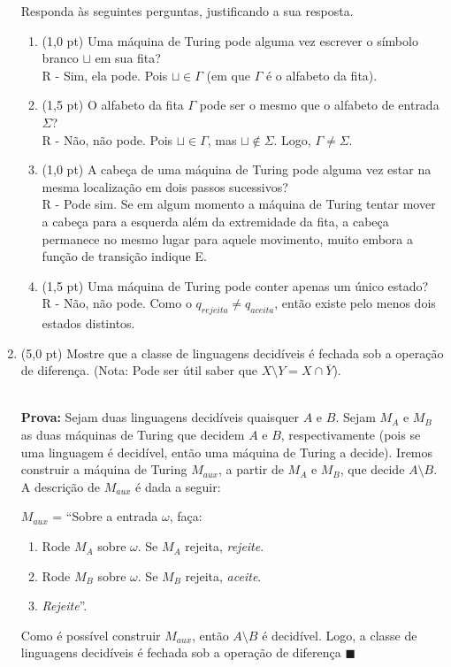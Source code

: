 \documentclass[12pt,a4paper,oneside]{article}
\begin{document}
\begin{enumerate}
	 Responda às seguintes perguntas, justificando a sua resposta.
	\begin{enumerate}
		\item (1,0 pt) Uma máquina de Turing pode alguma vez escrever o símbolo branco $\sqcup$ em sua fita? \\
		{\color{blue}
			R - Sim, ela pode. Pois $\sqcup \in \Gamma$ (em que $\Gamma$ é o alfabeto da fita).
		}
		\item (1,5 pt) O alfabeto da fita $\Gamma$ pode ser o mesmo que o alfabeto de entrada $\Sigma$? \\
		{\color{blue}
			R - Não, não pode. Pois $\sqcup \in \Gamma$, mas $\sqcup \not\in \Sigma$. Logo, $\Gamma \not= \Sigma$.
		}
		\item (1,0 pt) A cabeça de uma máquina de Turing pode alguma vez estar na mesma localização em dois passos sucessivos?\\
		{\color{blue}
			R - Pode sim. Se em algum momento a máquina de Turing tentar mover a cabeça para a esquerda além da extremidade da fita, a cabeça permanece no mesmo lugar para aquele movimento, muito embora a função de transição indique E. 
		}
		\item (1,5 pt) Uma máquina de Turing pode conter apenas um único estado?\\
		{\color{blue}
			R - Não, não pode. Como o $q_{rejeita} \not= q_{aceita}$, então existe pelo menos dois estados distintos.
		}
	\end{enumerate}

\newpage
	
	\item (5,0 pt) Mostre que a classe de linguagens decidíveis é fechada sob a operação de diferença. (Nota: Pode ser útil saber que $X \setminus Y = X \cap \overline{Y}$).\\
	\\{\color{blue}	
		{\bf Prova:} Sejam duas linguagens decidíveis quaisquer $A$ e $B$. Sejam $M_A$ e $M_B$ as duas máquinas de Turing que decidem $A$ e $B$, respectivamente (pois se uma linguagem é decidível, então uma máquina de Turing a decide). Iremos construir a máquina de Turing $M_{aux}$, a partir de $M_A$ e $M_B$, que decide $A \setminus B$. A descrição de $M_{aux}$ é dada a seguir:
		
		$M_{aux}$ = ``Sobre a entrada $\omega$, faça:
		\begin{enumerate}
			\item Rode $M_A$ sobre $\omega$. Se $M_A$ rejeita, {\it rejeite}.
			\item Rode $M_B$ sobre $\omega$. Se $M_B$ rejeita, {\it aceite}.
			\item {\it Rejeite}''.
		\end{enumerate}
		
		Como é possível construir $M_{aux}$, então $A \setminus B$ é decidível. Logo, a classe de linguagens decidíveis é fechada sob a operação de diferença $\blacksquare$
	}

\end{enumerate}
\end{document}

